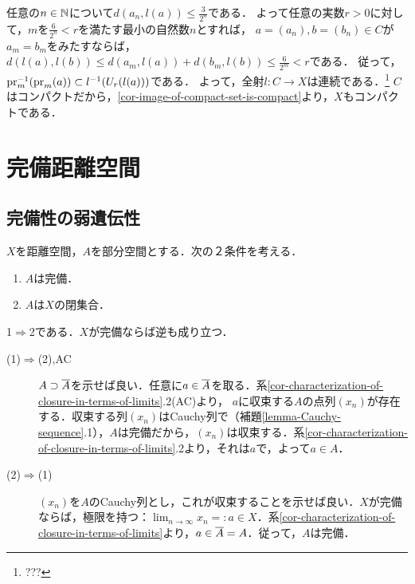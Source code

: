 \documentclass[uplatex,dvipdfmx]{jsreport}
\begin{document}
\begin{Proof}
\begin{description}
\begin{description}
            任意の$n\in\mathbb{N}$について$d(a_n,l(a))\le\frac{3}{2^n}$である．
            よって任意の実数$r>0$に対して，$m$を$\frac{6}{2^n}<r$を満たす最小の自然数$n$とすれば，
            $a=(a_n),b=(b_n)\in C$が$a_m=b_m$をみたすならば，$d(l(a),l(b))\le d(a_m,l(a))+d(b_m,l(b))\le\frac{6}{2^m}<r$である．
            従って，$\mathrm{pr}^{-1}_m(\mathrm{pr}_m(a))\subset l^{-1}(U_r(l(a)))$である．
            よって，全射$l:C\to X$は連続である．\footnote{???}
            $C$はコンパクトだから，\ref{cor-image-of-compact-set-is-compact}より，$X$もコンパクトである．
        \end{description}
    \end{description}
\end{Proof}

\section{完備距離空間}

\subsection{完備性の弱遺伝性}

\begin{proposition}[距離空間内の閉集合]\label{prop-complete-sets-in-metric-space}
    $X$を距離空間，$A$を部分空間とする．次の２条件を考える．
    \begin{enumerate}
        \item $A$は完備．
        \item $A$は$X$の閉集合．
    \end{enumerate}
    1$\Rightarrow$2である．$X$が完備ならば逆も成り立つ．
\end{proposition}
\begin{Proof}\mbox{}
    \begin{description}
        \item[(1)$\Rightarrow$(2),AC] $A\supset\overline{A}$を示せば良い．任意に$a\in\overline{A}$を取る．系\ref{cor-characterization-of-closure-in-terms-of-limits}.2(AC)より，
        $a$に収束する$A$の点列$(x_n)$が存在する．収束する列$(x_n)$はCauchy列で（補題\ref{lemma-Cauchy-sequence}.1），$A$は完備だから，$(x_n)$は収束する．系\ref{cor-characterization-of-closure-in-terms-of-limits}.2より，それは$a$で，よって$a\in A$．
        \item[(2)$\Rightarrow$(1)]
        $(x_n)$を$A$のCauchy列とし，これが収束することを示せば良い．$X$が完備ならば，極限を持つ：$\lim_{n\to\infty}x_n=:a\in X$．系\ref{cor-characterization-of-closure-in-terms-of-limits}より，$a\in\overline{A}=A$．従って，$A$は完備．
    \end{description}
\end{Proof}
\end{document}
